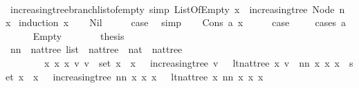 \begin{isabellebody}
\ \ \isanewline
{}\isamarkupfalse%
\ increasing{\isacharunderscore}tree{\isacharunderscore}branch{\isacharunderscore}list{\isacharunderscore}of{\isacharunderscore}empty\ {\isacharbrackleft}simp{\isacharbrackright}{\isacharcolon}\ {\isachardoublequoteopen}ListOfEmpty\ x\ {\isasymlongrightarrow}\ increasing{\isacharunderscore}tree\ {\isacharparenleft}Node\ n\ x{\isacharparenright}{\isachardoublequoteclose}\isanewline
%
\isadelimproof
%
\endisadelimproof
%
\isatagproof
{}\isamarkupfalse%
\ {\isacharparenleft}induction\ x{\isacharparenright}\isanewline
\ \ \isamarkupfalse%
\ Nil\isanewline
\ \ \isamarkupfalse%
\ \isamarkupfalse%
\ {\isacharquery}case\ \isamarkupfalse%
\ simp\isanewline
{}\isamarkupfalse%
\isanewline
\ \ \isamarkupfalse%
\ {\isacharparenleft}Cons\ a\ x{\isacharparenright}\isanewline
\ \ \isamarkupfalse%
\ \isamarkupfalse%
\ {\isacharquery}case\ \isanewline
\ \ \isamarkupfalse%
\ {\isacharparenleft}cases\ a{\isacharparenright}\isanewline
\ \ \ \ \isamarkupfalse%
\ Empty\isanewline
\ \ \ \ \isamarkupfalse%
\ \isamarkupfalse%
\ {\isacharquery}thesis\isanewline
\ \ \ \ \isamarkupfalse%
\ {\isacharminus}\isanewline
\ \ \ \ \ \ \isamarkupfalse%
\ nn\ {\isacharcolon}{\isacharcolon}\ {\isachardoublequoteopen}nattree\ list\ {\isasymRightarrow}\ nattree\ {\isasymRightarrow}\ nat\ {\isasymRightarrow}\ nattree{\isachardoublequoteclose}\ \isanewline
\ \ \ \ \ \ \ \ {\isachardoublequoteopen}{\isasymforall}x{}\ x{}\ x{}{\isachardot}\ {\isacharparenleft}{\isasymexists}v{}{\isachardot}\ v{}\ {\isasymin}\ set\ {\isacharparenleft}x{}\ {\isacharhash}\ x{}{\isacharparenright}\ {\isasymand}\ {\isacharparenleft}{\isasymnot}\ increasing{\isacharunderscore}tree\ v{}\ {\isasymor}\ {\isasymnot}\ lt{\isacharunderscore}nat{\isacharunderscore}tree\ x{}\ v{}{\isacharparenright}{\isacharparenright}\ {\isacharequal}\ {\isacharparenleft}nn\ x{}\ x{}\ x{}\ {\isasymin}\ set\ {\isacharparenleft}x{}\ {\isacharhash}\ x{}{\isacharparenright}\ {\isasymand}\ {\isacharparenleft}{\isasymnot}\ increasing{\isacharunderscore}tree\ {\isacharparenleft}nn\ x{}\ x{}\ x{}{\isacharparenright}\ {\isasymor}\ {\isasymnot}\ lt{\isacharunderscore}nat{\isacharunderscore}tree\ x{}\ {\isacharparenleft}nn\ x{}\ x{}\ x{}{\isacharparenright}{\isacharparenright}{\isacharparenright}{\isachardoublequoteclose}\isanewline

\end{isabellebody}
